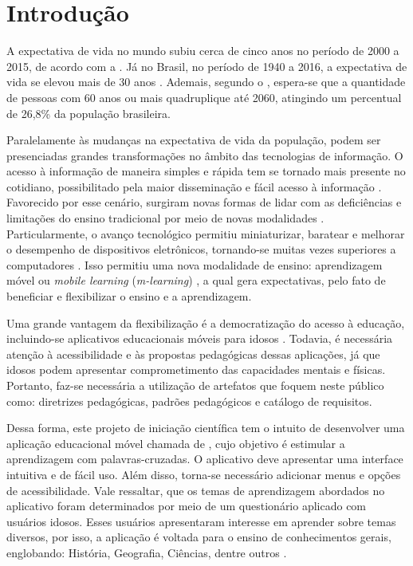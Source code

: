 \chapter{Introdução}
\label{sec:introd}
A expectativa de vida no mundo subiu cerca de cinco anos no período de 2000 a 2015, de acordo com a \cite{world2016world}. Já no Brasil, no período de 1940 a 2016, a expectativa de vida se elevou mais de 30 anos \citep{expectativabrasileiros}. Ademais, segundo o \cite{demografico2010disponivel}, espera-se que a quantidade de pessoas com 60 anos ou mais quadruplique até 2060, atingindo um percentual de 26,8\% da população brasileira.

Paralelamente às mudanças na expectativa de vida da população, podem ser presenciadas grandes transformações no âmbito das tecnologias de informação. O acesso à informação de maneira simples e rápida tem se tornado mais presente no cotidiano, possibilitado pela maior disseminação e fácil acesso à informação \citep{Grossi2014}. Favorecido por esse cenário, surgiram novas formas de lidar com as deficiências e limitações do ensino tradicional por meio de novas modalidades \citep{Behrens2005}. Particularmente, o avanço tecnológico permitiu miniaturizar, baratear e melhorar o desempenho de dispositivos eletrônicos, tornando-se muitas vezes superiores a computadores \citep{Zamfirache2013}. Isso permitiu uma nova modalidade de ensino: aprendizagem móvel ou \textit{mobile learning} (\textit{m-learning}) \citep{Crompton2013, Keegan2005, Traxler2006, Wu2012}, a qual gera expectativas, pelo fato de beneficiar e flexibilizar o ensino e a aprendizagem.

Uma grande vantagem da flexibilização é a democratização do acesso à educação, incluindo-se aplicativos educacionais móveis para idosos \citep{Oliveira2019_quali}. Todavia, é necessária atenção à acessibilidade e às propostas pedagógicas dessas aplicações, já que idosos podem apresentar comprometimento das capacidades mentais e físicas. Portanto, faz-se necessária a utilização de artefatos que foquem neste público como: diretrizes pedagógicas, padrões pedagógicos e catálogo de requisitos.

Dessa forma, este projeto de iniciação científica tem o intuito de desenvolver uma aplicação educacional móvel chamada de \crossword, cujo objetivo é estimular a aprendizagem com palavras-cruzadas. O aplicativo deve apresentar uma interface intuitiva e de fácil uso. Além disso, torna-se necessário adicionar menus e opções de acessibilidade. Vale ressaltar, que os temas de aprendizagem abordados no aplicativo foram determinados por meio de um questionário aplicado com usuários idosos. Esses usuários apresentaram interesse em aprender sobre temas diversos, por isso, a aplicação é voltada para o ensino de conhecimentos gerais, englobando: História, Geografia, Ciências, dentre outros \citep{oliveira2018crossword}. 

